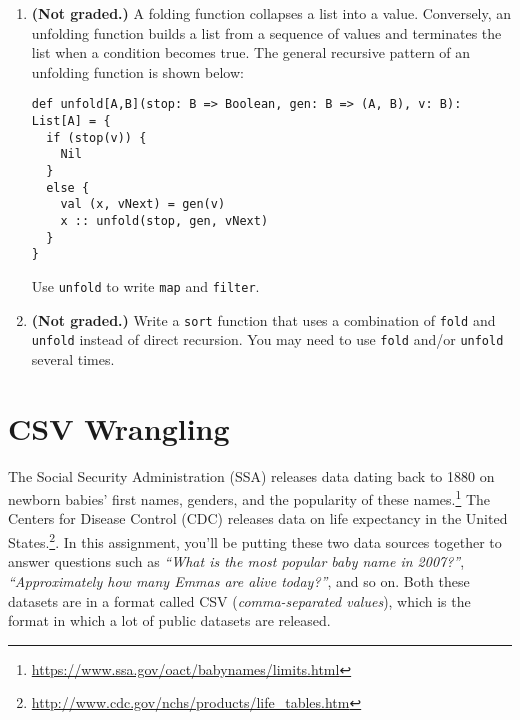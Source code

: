 \documentclass[9pt]{extbook}
\begin{document}
\begin{enumerate}
Rewrite the following functions using \lstinline|fold|. (i.e., do not directly
recur; let \lstinline|fold| handle recursion.)

\begin{lstlisting}
def length[A](alist: List[A]): Int = alist match {
  case Nil => 0
  case _ :: tail => 1 + length(tail)
}
  
def filter[A](f: A => Boolean, alist: List[Int]): List[A] = alist match {
  case Nil => Nil
  case head :: tail => f(head) match {
    case true => head :: filter(f, tail)
    case false => filter(f, tail)
  }
}

def map(f: Int => Int, alist: List[Int]): List[Int] = alist match {
  case Nil => Nil
  case h :: t => f(h) :: map(f, t)
}
\end{lstlisting}

\item \textbf{(Not graded.)} A folding function collapses a list into a value.
Conversely, an unfolding function builds a list from a sequence of values and
terminates the list when a condition becomes true. The general recursive
pattern of an unfolding function is shown below:

\begin{lstlisting}
def unfold[A,B](stop: B => Boolean, gen: B => (A, B), v: B): List[A] = {
  if (stop(v)) {
    Nil
  }
  else {
    val (x, vNext) = gen(v)
    x :: unfold(stop, gen, vNext)
  }
}
\end{lstlisting}

Use \lstinline|unfold| to write \lstinline|map| and \lstinline|filter|.

\item \textbf{(Not graded.)} Write a \lstinline|sort| function that uses
a combination of \lstinline|fold| and \lstinline|unfold| instead of direct
recursion. You may need to use \lstinline|fold| and/or \lstinline|unfold| several times.

\end{enumerate}



\chapter{CSV Wrangling}

The Social Security Administration (SSA) releases data dating back to
1880 on newborn babies' first names, genders, and the
popularity of these names.\footnote{\url{https://www.ssa.gov/oact/babynames/limits.html}}
The Centers for Disease Control (CDC) releases data on life expectancy
in the United States.\footnote{\url{http://www.cdc.gov/nchs/products/life_tables.htm}}.
In this assignment, you'll be putting these two data sources together
to answer questions such as
\emph{``What is the most popular baby name in 2007?''},
\emph{``Approximately how many Emmas are alive today?''}, and so on.
Both these datasets are in a format called CSV (\emph{comma-separated values}),
which is the format in which a lot of public datasets are released.
\end{document}
